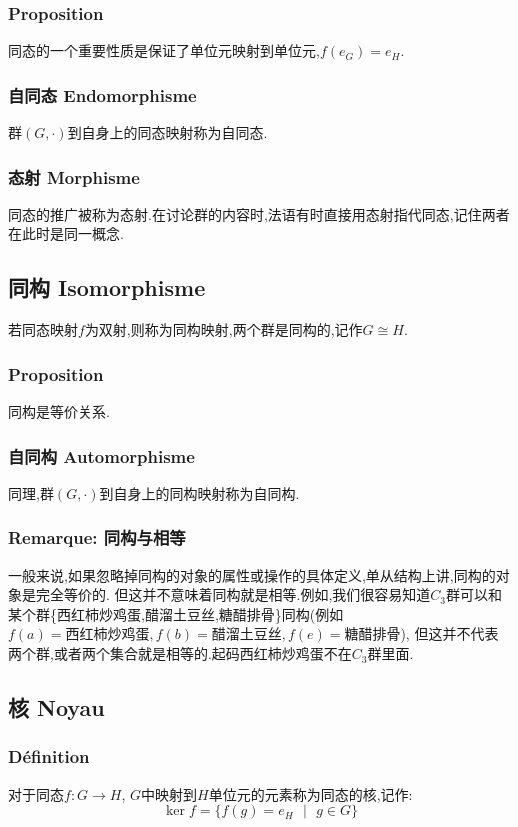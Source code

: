 \documentclass[12pt, a4paper, oneside]{ctexbook}
\begin{document}
  \subsubsection{Proposition}
  同态的一个重要性质是保证了单位元映射到单位元,$f(e_G)=e_H$.
  \subsubsection{自同态 Endomorphisme}
  群$(G,\cdot)$到自身上的同态映射称为自同态.
  \subsubsection{态射 Morphisme}
  同态的推广被称为态射.在讨论群的内容时,法语有时直接用态射指代同态,记住两者在此时是同一概念.
  \subsection{同构 Isomorphisme}    \label{myref:Isomorphisme}
  若同态映射$f$为双射,则称为同构映射,两个群是同构的,记作$G\cong H$.
  \subsubsection{Proposition}
  同构是等价关系.

  \subsubsection{自同构 Automorphisme}
  同理,群$(G,\cdot)$到自身上的同构映射称为自同构.
  \subsubsection{Remarque: 同构与相等}
  一般来说,如果忽略掉同构的对象的属性或操作的具体定义,单从结构上讲,同构的对象是完全等价的.
  但这并不意味着同构就是相等.例如,我们很容易知道$C_3$群可以和某个群\{西红柿炒鸡蛋,醋溜土豆丝,糖醋排骨\}同构(例如
  $f(a)=\text{西红柿炒鸡蛋},f(b)=\text{醋溜土豆丝},f(e)=\text{糖醋排骨}$),
  但这并不代表两个群,或者两个集合就是相等的.起码西红柿炒鸡蛋不在$C_3$群里面.

  \subsection{核 Noyau}
  \subsubsection{Définition}
  对于同态$f:G\rightarrow H $, $G$中映射到$H$单位元的元素称为同态的核,记作:
  $$
  \ker f=\{f(g)=e_H\text{ }|\text{ }g\in G  \}
  $$
\end{document}
